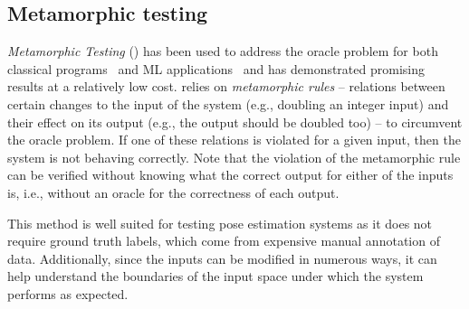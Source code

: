 \subsection{Metamorphic testing}
\label{sec:bg:metamorphic}


\textit{Metamorphic Testing} (\MetTest) has been used to address the oracle problem for both classical programs~\cite{xie2011testing} and ML applications~\cite{dwarakanath2018identifying} and has demonstrated promising results at a relatively low cost. \MetTest relies on \emph{metamorphic rules} -- relations between certain changes to the input of the system (e.g., doubling an integer input) and their effect on its output (e.g., the output should be doubled too) -- to circumvent the oracle problem. If one of these relations is violated for a given input, then the system is not behaving correctly. Note that the violation of the metamorphic rule can be verified without knowing what the correct output for either of the inputs is, i.e., without an oracle for the correctness of each output.

This method is well suited for testing pose estimation systems as it does not require ground truth labels, which come from expensive manual annotation of data. Additionally, since the inputs can be modified in numerous ways, it can help understand the boundaries of the input space under which the system performs as expected. 

